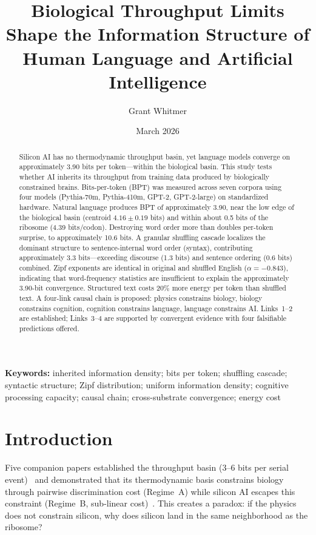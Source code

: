 \documentclass[11pt]{article}
\title{Biological Throughput Limits Shape the Information Structure of Human Language and Artificial Intelligence}
\author{Grant Whitmer}
\date{March 2026}
\begin{document}
\maketitle

\begin{abstract}
Silicon AI has no thermodynamic throughput basin, yet language models converge on approximately 3.90 bits per token---within the biological basin. This study tests whether AI inherits its throughput from training data produced by biologically constrained brains. Bits-per-token (BPT) was measured across seven corpora using four models (Pythia-70m, Pythia-410m, GPT-2, GPT-2-large) on standardized hardware. Natural language produces BPT of approximately 3.90, near the low edge of the biological basin (centroid $4.16 \pm 0.19$ bits) and within about 0.5 bits of the ribosome (4.39 bits/codon). Destroying word order more than doubles per-token surprise, to approximately 10.6 bits. A granular shuffling cascade localizes the dominant structure to sentence-internal word order (syntax), contributing approximately 3.3 bits---exceeding discourse (1.3 bits) and sentence ordering (0.6 bits) combined. Zipf exponents are identical in original and shuffled English ($\alpha = -0.843$), indicating that word-frequency statistics are insufficient to explain the approximately 3.90-bit convergence. Structured text costs 20\% more energy per token than shuffled text. A four-link causal chain is proposed: physics constrains biology, biology constrains cognition, cognition constrains language, language constrains AI. Links~1--2 are established; Links~3--4 are supported by convergent evidence with four falsifiable predictions offered.
\end{abstract}

\noindent\textbf{Keywords:} inherited information density; bits per token; shuffling cascade; syntactic structure; Zipf distribution; uniform information density; cognitive processing capacity; causal chain; cross-substrate convergence; energy cost

\section{Introduction}

Five companion papers established the throughput basin (3--6 bits per serial event)~\cite{whitmer2026fons,whitmer2026floor,whitmer2026basin,whitmer2026serial} and demonstrated that its thermodynamic basis constrains biology through pairwise discrimination cost (Regime~A) while silicon AI escapes this constraint (Regime~B, sub-linear cost)~\cite{whitmer2026dissipative}. This creates a paradox: if the physics does not constrain silicon, why does silicon land in the same neighborhood as the ribosome?
\end{document}
